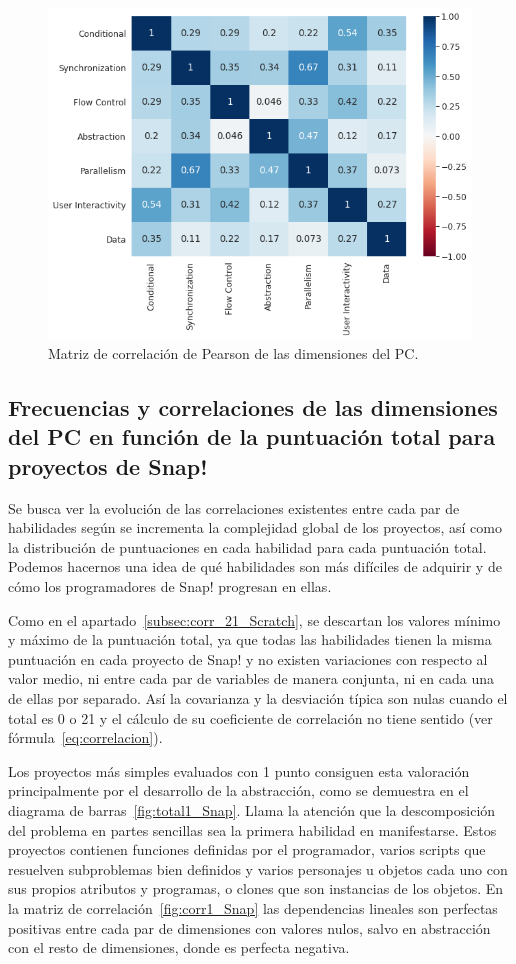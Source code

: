 \documentclass[a4paper, 12pt]{book}
\begin{document}
\begin{figure}[H]
    \centering
    \includegraphics[width=.7\textwidth]{img/corr_Snap.png}
    \caption{Matriz de correlación de Pearson de las dimensiones del PC.}\label{fig:corr_Snap}
\end{figure}

\subsection{Frecuencias y correlaciones de las dimensiones del PC en función de la puntuación total para proyectos de Snap!}
\label{subsec:corr_21_Snap}

Se busca ver la evolución de las correlaciones existentes entre cada par de habilidades según se incrementa la complejidad global de los proyectos, así como la distribución de puntuaciones en cada habilidad para cada puntuación total. Podemos hacernos una idea de qué habilidades son más difíciles de adquirir y de cómo los programadores de Snap! progresan en ellas.

Como en el apartado~\ref{subsec:corr_21_Scratch}, se descartan los valores mínimo y máximo de la puntuación total, ya que todas las habilidades tienen la misma puntuación en cada proyecto de Snap! y no existen variaciones con respecto al valor medio, ni entre cada par de variables de manera conjunta, ni en cada una de ellas por separado. Así la covarianza y la desviación típica son nulas cuando el total es 0 o 21 y el cálculo de su coeficiente de correlación no tiene sentido (ver fórmula~\eqref{eq:correlacion}). 

Los proyectos más simples evaluados con 1 punto consiguen esta valoración principalmente por el desarrollo de la abstracción, como se demuestra en el diagrama de barras~\ref{fig:total1_Snap}. Llama la atención que la descomposición del problema en partes sencillas sea la primera habilidad en manifestarse. Estos proyectos contienen funciones definidas por el programador, varios scripts que resuelven subproblemas bien definidos y varios personajes u objetos cada uno con sus propios atributos y programas, o clones que son instancias de los objetos. En la matriz de correlación~\ref{fig:corr1_Snap} las dependencias lineales son perfectas positivas entre cada par de dimensiones con valores nulos, salvo en abstracción con el resto de dimensiones, donde es perfecta negativa. %
\end{document}
